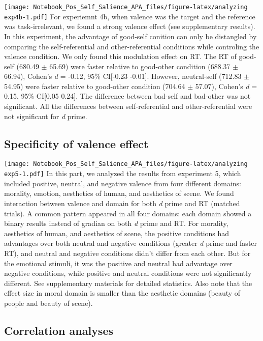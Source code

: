 \documentclass[man]{apa6}
\begin{document}
\texttt{[image: Notebook\_Pos\_Self\_Salience\_APA\_files/figure-latex/analyzing exp4b-1.pdf]}
For experiemnt 4b, when valence was the target and the reference was task-irrelevant, we found a strong valence effect (see supplementary results). In this experiment, the advantage of good-self conition can only be distangled by comparing the self-referential and other-referential conditions while controling the valence condition. We only found this modulation effect on RT. The RT of good-self (680.49 \(\pm\) 65.69) were faster relative to good-other condition (688.37 \(\pm\) 66.94), Cohen's \emph{d} = -0.12, 95\% CI{[}-0.23 -0.01{]}. However, neutral-self (712.83 \(\pm\) 54.95) were faster relative to good-other condition (704.64 \(\pm\) 57.07), Cohen's \emph{d} = 0.15, 95\% CI{[}0.05 0.24{]}. The difference between bad-self and bad-other was not significant. All the differences between self-referential and other-referential were not significant for \emph{d} prime.

\hypertarget{specificity-of-valence-effect}{%
\subsection{Specificity of valence effect}\label{specificity-of-valence-effect}}

\texttt{[image: Notebook\_Pos\_Self\_Salience\_APA\_files/figure-latex/analyzing exp5-1.pdf]}
In this part, we analyzed the results from experiment 5, which included positive, neutral, and negative valence from four different domains: morality, emotion, aesthetics of human, and aesthetics of scene. We found interaction between valence and domain for both \emph{d} prime and RT (matched trials). A common pattern appeared in all four domains: each domain showed a binary results instead of gradian on both \emph{d} prime and RT. For morality, aesthetics of human, and aesthetics of scene, the positive conditions had advantages over both neutral and negative conditions (greater \emph{d} prime and faster RT), and neutral and negative conditions didn't differ from each other. But for the emotional stimuli, it was the positive and neutral had advantage over negative conditions, while positive and neutral conditions were not significantly different. See supplementary materials for detailed statistics. Also note that the effect size in moral domain is smaller than the aesthetic domains (beauty of people and beauty of scene).

\hypertarget{correlation-analyses}{%
\subsection{Correlation analyses}\label{correlation-analyses}}
\end{document}

